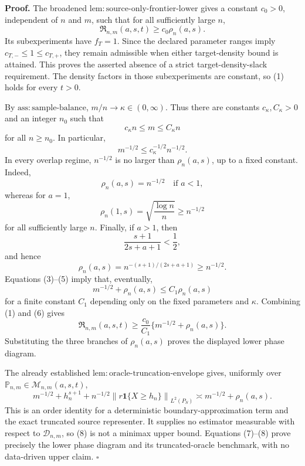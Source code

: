 \textbf{Proof.}
The broadened \(\mathrm{lem:source\text{-}only\text{-}frontier\text{-}lower}\) gives a constant \(c_0>0\), independent of \(n\) and \(m\), such that for all sufficiently large \(n\),
\[
 \mathfrak R_{n,m}(a,s,t)\ge c_0\rho_n(a,s).
\tag{1}
\]
Its subexperiments have \(f_T=1\). Since the declared parameter ranges imply \(c_{T,-}\le1\le c_{T,+}\), they remain admissible when either target-density bound is attained. This proves the asserted absence of a strict target-density-slack requirement. The density factors in those subexperiments are constant, so (1) holds for every \(t>0\).

By \(\mathrm{ass:sample\text{-}balance}\), \(m/n\to\kappa\in(0,\infty)\). Thus there are constants \(c_\kappa,C_\kappa>0\) and an integer \(n_0\) such that
\[
 c_\kappa n\le m\le C_\kappa n
\tag{2}
\]
for all \(n\ge n_0\). In particular,
\[
 m^{-1/2}\le c_\kappa^{-1/2}n^{-1/2}.
\tag{3}
\]
In every overlap regime, \(n^{-1/2}\) is no larger than \(\rho_n(a,s)\), up to a fixed constant. Indeed,
\[
 \rho_n(a,s)=n^{-1/2}\quad\text{if }a<1,
\]
whereas for \(a=1\),
\[
 \rho_n(1,s)=\sqrt{\frac{\log n}{n}}\ge n^{-1/2}
\tag{4}
\]
for all sufficiently large \(n\). Finally, if \(a>1\), then
\[
 \frac{s+1}{2s+a+1}<\frac12,
\]
and hence
\[
 \rho_n(a,s)=n^{-(s+1)/(2s+a+1)}\ge n^{-1/2}.
\tag{5}
\]
Equations (3)--(5) imply that, eventually,
\[
 m^{-1/2}+\rho_n(a,s)\le C_1\rho_n(a,s)
\tag{6}
\]
for a finite constant \(C_1\) depending only on the fixed parameters and \(\kappa\). Combining (1) and (6) gives
\[
 \mathfrak R_{n,m}(a,s,t)
 \ge \frac{c_0}{C_1}\{m^{-1/2}+\rho_n(a,s)\}.
\tag{7}
\]
Substituting the three branches of \(\rho_n(a,s)\) proves the displayed lower phase diagram.

The already established \(\mathrm{lem:oracle\text{-}truncation\text{-}envelope}\) gives, uniformly over \(\mathbb P_{n,m}\in\mathcal M_{n,m}(a,s,t)\),
\[
 m^{-1/2}+h_n^{s+1}
 +n^{-1/2}\left\|r\mathbf 1\{X\ge h_n\}\right\|_{L^2(P_S)}
 \asymp m^{-1/2}+\rho_n(a,s).
\tag{8}
\]
This is an order identity for a deterministic boundary-approximation term and the exact truncated source representer. It supplies no estimator measurable with respect to \(\mathcal D_{n,m}\), so (8) is not a minimax upper bound. Equations (7)--(8) prove precisely the lower phase diagram and its truncated-oracle benchmark, with no data-driven upper claim. \(\square\)